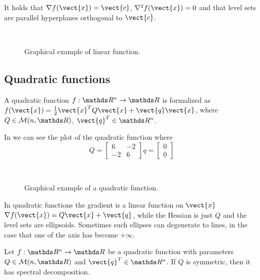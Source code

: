 \documentclass[computationalMathematics.tex]{subfiles}
\begin{document}
It holds that $\nabla f(\vect{x}) = \vect{c}$, $\nabla^2 f(\vect{x}) = 0$ and that level sets are parallel hyperplanes orthogonal to $\vect{c}$.

\begin{figure}[h]
  \centering
  
  \hspace{0.5cm}
  \\
  \caption{Graphical example of linear function.}\label{fig:3ott_1}
\end{figure}

\subsection{Quadratic functions}
A quadratic function $f:\R^n \to \R$ is formalized as $f(\vect{x}) = \frac{1}{2} \tr{\vect{x}} Q \vect{x} + \vect{q}\vect{x}$, where $Q \in \mathcal{M}(n, \R)$, $\tr{\vect{q}} \in \R^n$.

In  we can see the plot of the quadratic function where 
\[
  Q = \left[\begin{array}{rr} 6 & -2 \\ -2 & 6 \end{array}\right]
  q = \left[\begin{array}{rr} 0 \\ 0 \end{array}\right]
\]

\begin{figure}[h]
  \centering
  \hspace{0.5cm}
  \\
  \caption{Graphical example of a quadratic function.}\label{fig:3ott_2}
\end{figure}

In quadratic functions the gradient is a linear function on $\vect{x}$ $\nabla f(\vect{x}) = Q \vect{x} + \vect{q}$, while the Hessian is just $Q$ and the level sets are ellipsoids.
Sometimes such ellipses can degenerate to lines, in the case that one of the axis has become $+\infty$.

\begin{proposition}
  Let $f:\R^n \to \R$ be a quadratic function with parameters $Q \in \mathcal{M}(n, \R)$ and $\tr{\vect{q}} \in \R^n$.
  If $Q$ is symmetric, then it has spectral decomposition.
\end{proposition}
\end{document}
